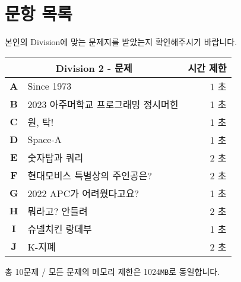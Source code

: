 \newpage
\vspace*{5cm}

{\centering \section*{문항 목록}}
\begin{center}    
    본인의 Division에 맞는 문제지를 받았는지 확인해주시기 바랍니다.
    
    \vspace*{0.3cm}
    \renewcommand{\arraystretch}{1.6}
    \begin{tabular}{|c l|r|}
        \hline
        \multicolumn{2}{|c}{\textbf{Division 2} - 문제} & \multicolumn{1}{|c|}{시간 제한} \\ 
        \hline
        \hline
        \textbf{A} & Since 1973 & 1 초\\
        \textbf{B} & 2023 아주머학교 프로그래밍 정시머힌 & 1 초\\
        \textbf{C} & 원, 탁! & 1 초\\
        \textbf{D} & Space-A & 1 초 \\
        \textbf{E} & 숫자탑과 쿼리 & 2 초\\
        \textbf{F} & 현대모비스 특별상의 주인공은? & 2 초\\
        \textbf{G} & 2022 APC가 어려웠다고요? & 1 초\\
        \textbf{H} & 뭐라고? 안들려 & 2 초\\
        \textbf{I} & 슈넬치킨 랑데부 & 1 초\\
        \textbf{J} & K-지폐 & 2 초\\
        \hline
    \end{tabular}
    
    \vspace*{0.2cm}

    총 10문제 / 모든 문제의 메모리 제한은 1024\texttt{MB}로 동일합니다.
\end{center}